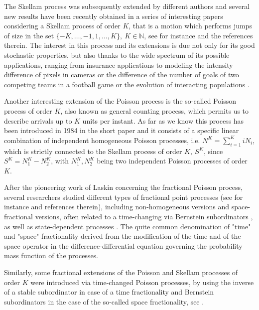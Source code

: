 \documentclass[12pt, twoside, english, headsepline]{article}
\theoremstyle{definition} %
\numberwithin{equation}{section} %
\begin{document}
The Skellam process was subsequently extended by different authors and several new results have been recently obtained in a series of interesting papers considering a Skellam process of order $K$, that is a motion which performs jumps of size in the set $\{-K,\dots,-1,1,\dots,K\},\ K\in\mathbb{N}$, see for instance \cite{GKL2020, KK2024} and the references therein. The interest in this process and its extensions is due not only for its good stochastic properties, but also thanks to the wide spectrum of its possible applications, ranging from insurance applications to modeling the intensity difference of pixels in cameras \cite{KN2008} or the difference of the number of goals of two competing teams in a football game \cite{HJK2007} or the evolution of interacting populations \cite{CO2026}.


Another interesting extension of the Poisson process is the so-called Poisson process of order $K$, also known as general counting process, which permits us to describe arrivals up to $K$ units per instant. As far as we know this process has been introduced in 1984 in the short paper \cite{P1984} and it consists of a specific linear combination of independent homogeneous Poisson processes, i.e. $N^K = \sum_{i=1}^K i N_i$, which is strictly connected to the Skellam process of order $K,\ S^K$, since $S^K = N_1^K - N_2^K$, with $N_1^K,N_2^K$ being two independent Poisson processes of order $K$.

After the pioneering work of Laskin \cite{L2003} concerning the fractional Poisson process, several researchers studied different types of fractional point processes (see for instance \cite{BM2014, GKMR2014, PKS2011} and references therein), including non-homogeneous versions \cite{MV2019} and space-fractional versions, often related to a time-changing via Bernstein subordinators \cite{GOS2017, OT2015}, as well as state-dependent processes \cite{C2022, GOP2015, KV2019}. The quite common denomination of "time" and "space" fractionality derived from the modification of the time and of the space operator in the difference-differential equation governing the probability mass function of the processes.

Similarly, some fractional extensions of the Poisson and Skellam processes of order $K$ were introduced via time-changed Poisson processes, by using the inverse of a stable subordinator in case of a time fractionality and Bernstein subordinators in the case of the so-called space fractionality, see \cite{BS2024, DcMM2016, GKL2020, KK2024, KV2019, SMU2020}.
\\
\end{document}
